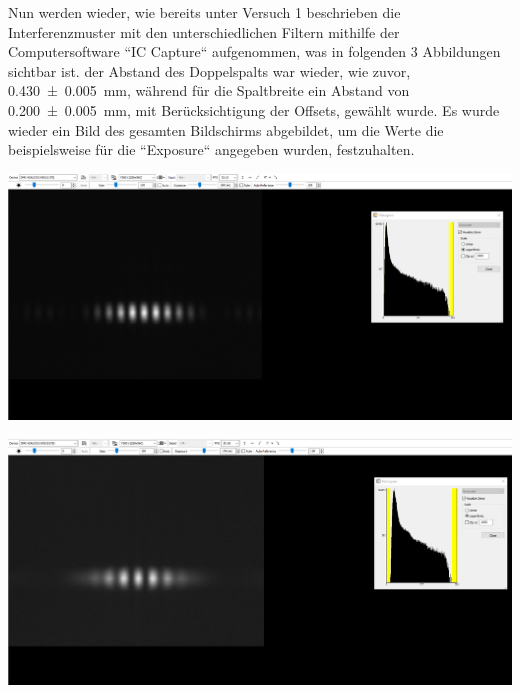 \documentclass[11pt,ngerman]{scrartcl}
\begin{document}
\noindent Nun werden wieder, wie bereits unter Versuch 1 beschrieben die Interferenzmuster mit den unterschiedlichen Filtern mithilfe der  Computersoftware ``IC Capture`` aufgenommen, was in folgenden 3 Abbildungen sichtbar ist. der Abstand des Doppelspalts war wieder, wie zuvor, \SI{0.430(5)}{mm}, während für die Spaltbreite ein Abstand von \SI{0.200(5)}{mm}, mit Berücksichtigung der Offsets, gewählt wurde. Es wurde wieder ein Bild des gesamten Bildschirms abgebildet, um die Werte die beispielsweise für die ``Exposure`` angegeben wurden, festzuhalten.

\begin{center}
	\begin{minipage}[t]{\textwidth}
		\includegraphics[width=\textwidth]{Interfero/Versuch2/bandpassfilter}
		\label{fig:bandpassfilter}
	\end{minipage}
\end{center}

\begin{center}
	\begin{minipage}[t]{\textwidth}
		\includegraphics[width=\textwidth]{Interfero/Versuch2/langpassfilter}
		\label{fig:langpassfilter}
	\end{minipage}
\end{center}
\end{document}
